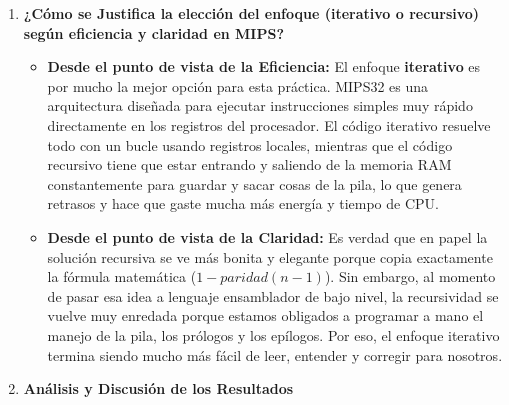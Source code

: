 \documentclass[12pt,letterpaper]{article}
\begin{document}
\begin{enumerate}
    \newpage
    \item \textbf{\large\color{UCBlue}¿Cómo se Justifica la elección del enfoque (iterativo o recursivo) según eficiencia y claridad en MIPS?}
    
    \vspace{0.3cm}
    \begin{itemize}
        \item \textbf{Desde el punto de vista de la Eficiencia:} El enfoque \textbf{iterativo} es por mucho la mejor opción para esta práctica. MIPS32 es una arquitectura diseñada para ejecutar instrucciones simples muy rápido directamente en los registros del procesador. El código iterativo resuelve todo con un bucle usando registros locales, mientras que el código recursivo tiene que estar entrando y saliendo de la memoria RAM constantemente para guardar y sacar cosas de la pila, lo que genera retrasos y hace que gaste mucha más energía y tiempo de CPU.
        \item \textbf{Desde el punto de vista de la Claridad:} Es verdad que en papel la solución recursiva se ve más bonita y elegante porque copia exactamente la fórmula matemática ($1 - paridad(n-1)$). Sin embargo, al momento de pasar esa idea a lenguaje ensamblador de bajo nivel, la recursividad se vuelve muy enredada porque estamos obligados a programar a mano el manejo de la pila, los prólogos y los epílogos. Por eso, el enfoque iterativo termina siendo mucho más fácil de leer, entender y corregir para nosotros.
    \end{itemize}

    \item \textbf{\large\color{UCBlue}Análisis y Discusión de los Resultados}
    

\end{enumerate}
\end{document}
